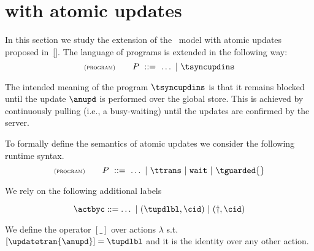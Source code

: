 
\section{{\gsp} with atomic updates}
\label{sec:transactions}

In this section we study the extension of the \gsp\ model with atomic updates proposed in~\ref{}. 
The language of programs is extended in the following way: 
\[
 \rName{program} 
			 \qquad 
			 \tprogram \ ::=\  \ldots\ |\ \tsyncupdins 
\]

The intended meaning of the program  $\tsyncupdins$ is that it remains blocked until the 
update $\anupd$ is performed over the global store.  This is achieved by continuously pulling (i.e., 
a busy-waiting) until the updates are confirmed by the server. 

To formally define the semantics of atomic updates we consider the following 
runtime syntax.
\[
 \rName{program} 
			 \qquad 
			 \tprogram \ ::=\  \ldots\ |\  \ttrans\ |\ \waitcmd \ |\ \tguarded{} 
			 \]

We rely  on the following additional labels
			 
\[  \actbyc ::= \ldots \ |\ (\tupdlbl,\cid)\  |\ (\finishsynctran,\cid)
\]


We define the operator $[\_]$ over actions  $\lambda$ s.t. $[\updatetran{\anupd}] =\tupdlbl$ and it is the identity
over any other action.

